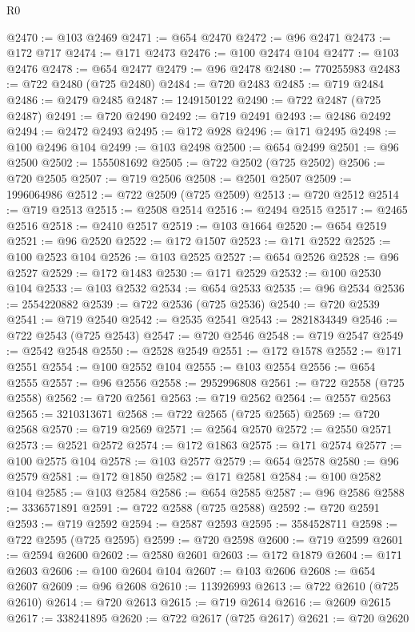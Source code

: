 \begin{lexlean}{R0}
\begin{coremodule}
@2470 := @103 @2469
@2471 := @654 @2470
@2472 := @96 @2471
@2473 := @172 @717
@2474 := @171 @2473
@2476 := @100 @2474 @104
@2477 := @103 @2476
@2478 := @654 @2477
@2479 := @96 @2478
@2480 := 770255983
@2483 := @722 @2480 (@725 @2480)
@2484 := @720 @2483
@2485 := @719 @2484
@2486 := @2479 @2485
@2487 := 1249150122
@2490 := @722 @2487 (@725 @2487)
@2491 := @720 @2490
@2492 := @719 @2491
@2493 := @2486 @2492
@2494 := @2472 @2493
@2495 := @172 @928
@2496 := @171 @2495
@2498 := @100 @2496 @104
@2499 := @103 @2498
@2500 := @654 @2499
@2501 := @96 @2500
@2502 := 1555081692
@2505 := @722 @2502 (@725 @2502)
@2506 := @720 @2505
@2507 := @719 @2506
@2508 := @2501 @2507
@2509 := 1996064986
@2512 := @722 @2509 (@725 @2509)
@2513 := @720 @2512
@2514 := @719 @2513
@2515 := @2508 @2514
@2516 := @2494 @2515
@2517 := @2465 @2516
@2518 := @2410 @2517
@2519 := @103 @1664
@2520 := @654 @2519
@2521 := @96 @2520
@2522 := @172 @1507
@2523 := @171 @2522
@2525 := @100 @2523 @104
@2526 := @103 @2525
@2527 := @654 @2526
@2528 := @96 @2527
@2529 := @172 @1483
@2530 := @171 @2529
@2532 := @100 @2530 @104
@2533 := @103 @2532
@2534 := @654 @2533
@2535 := @96 @2534
@2536 := 2554220882
@2539 := @722 @2536 (@725 @2536)
@2540 := @720 @2539
@2541 := @719 @2540
@2542 := @2535 @2541
@2543 := 2821834349
@2546 := @722 @2543 (@725 @2543)
@2547 := @720 @2546
@2548 := @719 @2547
@2549 := @2542 @2548
@2550 := @2528 @2549
@2551 := @172 @1578
@2552 := @171 @2551
@2554 := @100 @2552 @104
@2555 := @103 @2554
@2556 := @654 @2555
@2557 := @96 @2556
@2558 := 2952996808
@2561 := @722 @2558 (@725 @2558)
@2562 := @720 @2561
@2563 := @719 @2562
@2564 := @2557 @2563
@2565 := 3210313671
@2568 := @722 @2565 (@725 @2565)
@2569 := @720 @2568
@2570 := @719 @2569
@2571 := @2564 @2570
@2572 := @2550 @2571
@2573 := @2521 @2572
@2574 := @172 @1863
@2575 := @171 @2574
@2577 := @100 @2575 @104
@2578 := @103 @2577
@2579 := @654 @2578
@2580 := @96 @2579
@2581 := @172 @1850
@2582 := @171 @2581
@2584 := @100 @2582 @104
@2585 := @103 @2584
@2586 := @654 @2585
@2587 := @96 @2586
@2588 := 3336571891
@2591 := @722 @2588 (@725 @2588)
@2592 := @720 @2591
@2593 := @719 @2592
@2594 := @2587 @2593
@2595 := 3584528711
@2598 := @722 @2595 (@725 @2595)
@2599 := @720 @2598
@2600 := @719 @2599
@2601 := @2594 @2600
@2602 := @2580 @2601
@2603 := @172 @1879
@2604 := @171 @2603
@2606 := @100 @2604 @104
@2607 := @103 @2606
@2608 := @654 @2607
@2609 := @96 @2608
@2610 := 113926993
@2613 := @722 @2610 (@725 @2610)
@2614 := @720 @2613
@2615 := @719 @2614
@2616 := @2609 @2615
@2617 := 338241895
@2620 := @722 @2617 (@725 @2617)
@2621 := @720 @2620

\end{coremodule}
\end{lexlean}
